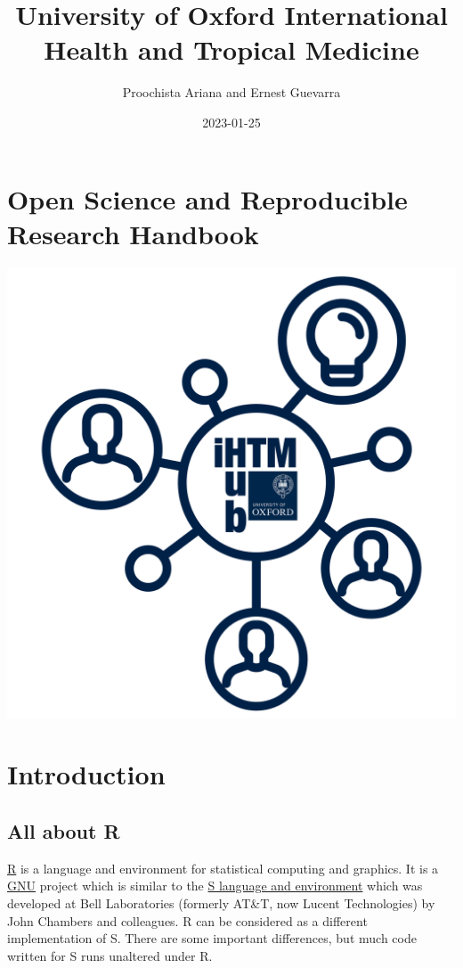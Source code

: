 \documentclass[
  12pt,
]{book}
\title{University of Oxford International Health and Tropical Medicine}
\author{Proochista Ariana and Ernest Guevarra}
\date{2023-01-25}
\begin{document}
\maketitle

{
\hypersetup{linkcolor=}
\setcounter{tocdepth}{1}
\tableofcontents
}
\hypertarget{open-science-and-reproducible-research-handbook}{%
\chapter*{Open Science and Reproducible Research Handbook}\label{open-science-and-reproducible-research-handbook}}

\includegraphics{images/ihtm_small.png}

\hypertarget{introduction}{%
\chapter{Introduction}\label{introduction}}

\hypertarget{all-about-r}{%
\section{All about R}\label{all-about-r}}

\href{https://r-project.org}{R} is a language and environment for statistical computing and graphics. It is a \href{https://en.wikipedia.org/wiki/GNU}{GNU} project which is similar to the \href{https://en.wikipedia.org/wiki/S_(programming_language)}{S language and environment} which was developed at Bell Laboratories (formerly AT\&T, now Lucent Technologies) by John Chambers and colleagues. R can be considered as a different implementation of S. There are some important differences, but much code written for S runs unaltered under R.
\end{document}
